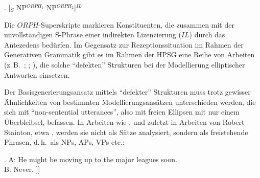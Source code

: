 \ex. \label{ex-tag-unvoll-3}[$_S$ NP$^{\mathit{ORPH}_1}$ NP$^{\mathit{ORPH}_2}$]$^{\mathit{IL}}$ \hfill \citep[277]{Culicover:Jackendoff:05}

Die $ORPH$-Superskripte markieren Konstituenten, die zusammen mit der unvollständigen S-Phrase einer indirekten Lizenzierung ($IL$) durch das Antezedens bedürfen. Im Gegensatz zur Rezeptionssituation im Rahmen der Generativen Grammatik gibt es im Rahmen der HPSG eine Reihe von Arbeiten (z.\,B.\ \citealt{Ginzburg:Sag:01}; \citealt[333f]{Ginzburg:Cooper:04}; \citealt[171ff]{Schlangen:03}), die solche "`defekten"' Strukturen bei der Modellierung elliptischer Antworten einsetzen. 

Der Basisgenerierungsansatz mittels "`defekter"' Strukturen muss trotz gewisser Ähnlichkeiten von bestimmten Modellierungsansätzen unterschieden werden, die sich mit "`non-senten\-tial utterances"', also mit freien Ellipsen mit nur einem Überbleibsel, befassen. In Arbeiten wie \cite{Yanofsky:78}, \cite{Barton:90} und zuletzt in Arbeiten von Robert Stainton, etwa \cite{Stainton:98,Stainton:06}, werden sie nicht als Sätze analysiert, sondern als freistehende Phrasen, d.\,h.\ als NPs, APs, VPs etc.:

\ex. \label{ex-freistehende-phrasen}
A: He might be moving up to the major leagues soon. \\
B: Never. \newline
[$_{\mathit{ADV}\,''}$ [$_{\mathit{ADV}\,'}$ [$_{\mathit{ADV}}$ never]]] \\
\citep[60]{Barton:90}
 
